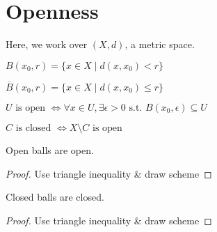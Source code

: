\section{Openness}
Here, we work over $(X,d)$, a metric space.
\begin{definition}
	$B(x_0,r) = \{ x \in X \mid d(x,x_0)<r \}$
\end{definition}
\begin{definition}
	$\overline{B}(x_0,r) = \{ x \in X \mid d(x,x_0) \leq r \}$
\end{definition}
\begin{definition}
	$U \text{ is open } \iff \forall x \in U, \exists \epsilon>0 \text{ s.t. } B(x_0,\epsilon) \subseteq U$
\end{definition}
\begin{definition}
	$C \text{ is closed } \iff X \setminus C \text{ is open}$
\end{definition}
\begin{property}
	Open balls are open.
\end{property}
\begin{proof}
	Use triangle inequality \& draw scheme
\end{proof}
\begin{property}
	Closed balls are closed.
\end{property}
\begin{proof}
	Use triangle inequality \& draw scheme
\end{proof}


